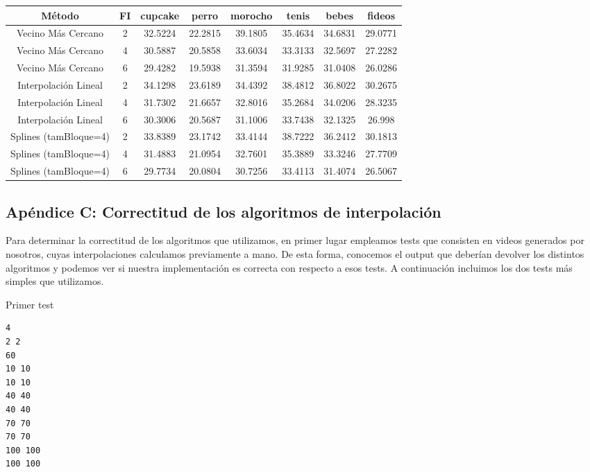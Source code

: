 \begin{tabular}{| c | c | c | c | c | c | c | c |} 
\hline
\textbf{Método} & \textbf{FI} & \textbf{cupcake} & \textbf{perro} & \textbf{morocho} & \textbf{tenis} & \textbf{bebes} & \textbf{fideos} \\ 
\hline
Vecino Más Cercano & 2 & 32.5224 &  22.2815 & 39.1805 &  35.4634 & 34.6831 & 29.0771 \\
\hline
Vecino Más Cercano & 4 & 30.5887 &  20.5858 & 33.6034 &  33.3133 & 32.5697 & 27.2282 \\
\hline
Vecino Más Cercano & 6 & 29.4282 &  19.5938 & 31.3594 &  31.9285 & 31.0408 &  26.0286 \\
\hline
Interpolación Lineal & 2 & 34.1298 &  23.6189 & 34.4392 &  38.4812 & 36.8022 &   30.2675 \\
\hline
Interpolación Lineal & 4 & 31.7302 &  21.6657 & 32.8016 &  35.2684 & 34.0206 &  28.3235 \\
\hline
Interpolación Lineal & 6 & 30.3006 & 20.5687  & 31.1006 &  33.7438 & 32.1325 & 26.998 \\
\hline
Splines (tamBloque=4) & 2 & 33.8389 &  23.1742 & 33.4144 &  38.7222 & 36.2412 & 30.1813 \\
\hline
Splines (tamBloque=4) & 4 & 31.4883 &  21.0954 & 32.7601 &  35.3889 & 33.3246 &  27.7709 \\
\hline
Splines (tamBloque=4) & 6 & 29.7734 &  20.0804 & 30.7256 & 33.4113  & 31.4074 & 26.5067 \\
\hline
\end{tabular}

\newpage

\subsection{Ap\'endice C: Correctitud de los algoritmos de interpolaci\'on}

\par Para determinar la correctitud de los algoritmos que utilizamos, en primer lugar empleamos tests que consisten en videos generados por nosotros, cuyas interpolaciones calculamos previamente a mano.
De esta forma, conocemos el output que deber\'ian devolver los distintos algoritmos y podemos ver si nuestra implementaci\'on es correcta con respecto a esos tests.
A continuaci\'on incluimos los dos tests m\'as simples que utilizamos.

\caption{Primer test}
\begin{verbatim}
4
2 2
60
10 10
10 10
40 40
40 40
70 70
70 70
100 100
100 100
\end{verbatim}

